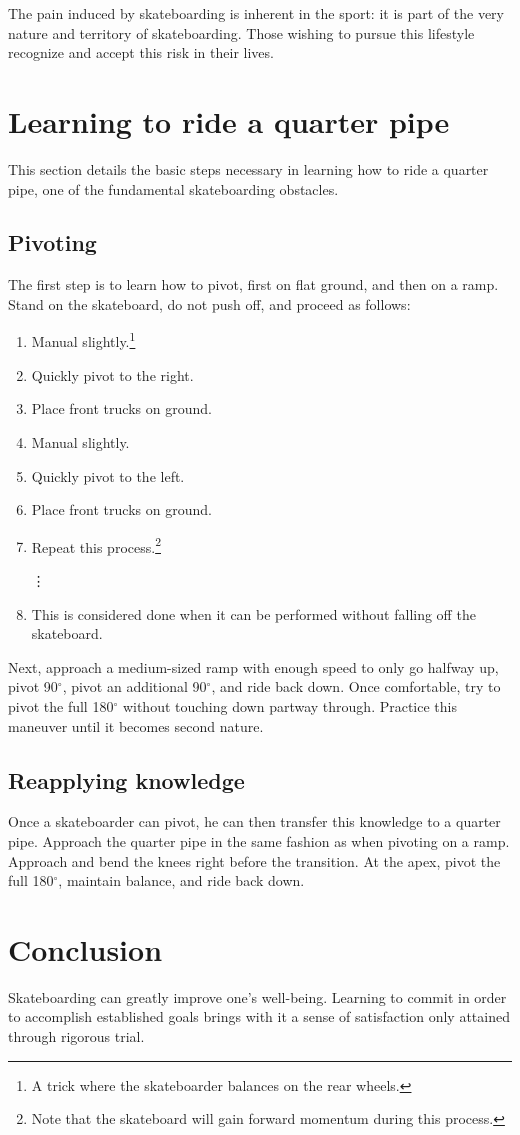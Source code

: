 \documentclass{acm_proc_article-sp}
\begin{document}
The pain induced by skateboarding is inherent in the sport: it is part of the very nature and territory of skateboarding. Those wishing to pursue this lifestyle recognize and accept this risk in their lives.

\section{Learning to ride a quarter pipe}
This section details the basic steps necessary in learning how to ride a quarter pipe, one of the fundamental skateboarding obstacles.

\subsection{Pivoting}
The first step is to learn how to pivot, first on flat ground, and then on a ramp. Stand on the skateboard, do not push off, and proceed as follows:
\vspace{-1em}\begin{enumerate}
    \itemsep0em
    \item Manual slightly.\footnote{A trick where the skateboarder balances on the rear wheels.}
    \item Quickly pivot to the right.
    \item Place front trucks on ground.
    \item Manual slightly.
    \item Quickly pivot to the left.
    \item Place front trucks on ground.
    \item Repeat this process.\footnote{Note that the skateboard will gain forward momentum during this process.}
    
    \vspace{-0.25em}\hspace{6em}\vdots
    \item This is considered done when it can be performed without falling off the skateboard.
\end{enumerate}

\vspace{-1em}Next, approach a medium-sized ramp with enough speed to only go halfway up, pivot 90$^\circ$, pivot an additional 90$^\circ$, and ride back down. Once comfortable, try to pivot the full 180$^\circ$ without touching down partway through. Practice this maneuver until it becomes second nature.

\subsection{Reapplying knowledge}
Once a skateboarder can pivot, he can then transfer this knowledge to a quarter pipe. Approach the quarter pipe in the same fashion as when pivoting on a ramp. Approach and bend the knees right before the transition. At the apex, pivot the full 180$^\circ$, maintain balance, and ride back down.

\section{Conclusion}
Skateboarding can greatly improve one's well-being. Learning to commit in order to accomplish established goals brings with it a sense of satisfaction only attained through rigorous trial.

\balancecolumns
\end{document}
